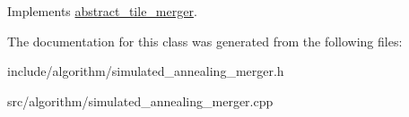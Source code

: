 Implements \hyperlink{classabstract__tile__merger_a7922b65624d12ef2d6c115218d2378b4}{abstract\-\_\-tile\-\_\-merger}.



The documentation for this class was generated from the following files\-:\begin{DoxyCompactItemize}
\item 
include/algorithm/simulated\-\_\-annealing\-\_\-merger.\-h\item 
src/algorithm/simulated\-\_\-annealing\-\_\-merger.\-cpp\end{DoxyCompactItemize}
